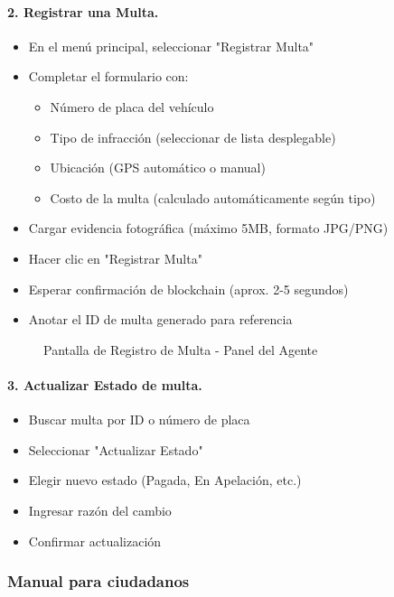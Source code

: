 \paragraph{2. Registrar una Multa.}
\begin{itemize}
    \item En el menú principal, seleccionar "Registrar Multa"
    \item Completar el formulario con:
    \begin{itemize}
        \item Número de placa del vehículo
        \item Tipo de infracción (seleccionar de lista desplegable)
        \item Ubicación (GPS automático o manual)
        \item Costo de la multa (calculado automáticamente según tipo)
    \end{itemize}
    \item Cargar evidencia fotográfica (máximo 5MB, formato JPG/PNG)
    \item Hacer clic en "Registrar Multa"
    \item Esperar confirmación de blockchain (aprox. 2-5 segundos)
    \item Anotar el ID de multa generado para referencia
\end{itemize}

\begin{figure}[htbp]
    \centering
    \caption{Pantalla de Registro de Multa - Panel del Agente}
\end{figure}

\paragraph{3. Actualizar Estado de multa.}
\begin{itemize}
    \item Buscar multa por ID o número de placa
    \item Seleccionar "Actualizar Estado"
    \item Elegir nuevo estado (Pagada, En Apelación, etc.)
    \item Ingresar razón del cambio
    \item Confirmar actualización
\end{itemize}

\subsubsection{Manual para ciudadanos}

